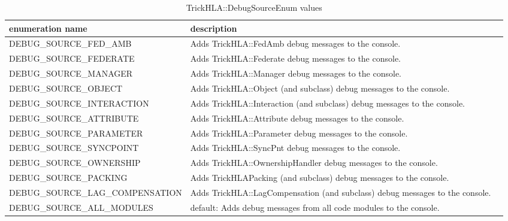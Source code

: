 \begin{table}[ht]
  \scriptsize
  \begin{center}
    \begin{tabular}{|p{2in}|l|p{3.25in}|}
    \hline
    enumeration name & description \\
    \hline \hline
      {\ttfamily DEBUG\_SOURCE\_FED\_AMB}
      & Adds {\ttfamily TrickHLA::FedAmb} debug messages to the console.
      \\
      \hline
      {\ttfamily DEBUG\_SOURCE\_FEDERATE}
      & Adds {\ttfamily TrickHLA::Federate} debug messages to the console.
      \\
      \hline
      {\ttfamily DEBUG\_SOURCE\_MANAGER}
      & Adds {\ttfamily TrickHLA::Manager} debug messages to the console.
      \\
      \hline
      {\ttfamily DEBUG\_SOURCE\_OBJECT}
      & Adds {\ttfamily TrickHLA::Object} (and subclass) debug messages to the
        console.
      \\
      \hline
      {\ttfamily DEBUG\_SOURCE\_INTERACTION}
      & Adds {\ttfamily TrickHLA::Interaction} (and subclass) debug messages to
        the console.
      \\
      \hline
      {\ttfamily DEBUG\_SOURCE\_ATTRIBUTE}
      & Adds {\ttfamily TrickHLA::Attribute} debug messages to the console.
      \\
      \hline
      {\ttfamily DEBUG\_SOURCE\_PARAMETER}
      & Adds {\ttfamily TrickHLA::Parameter} debug messages to the console.
      \\
      \hline
      {\ttfamily DEBUG\_SOURCE\_SYNCPOINT}
      & Adds {\ttfamily TrickHLA::SyncPnt} debug messages to the console.
      \\
      \hline
      {\ttfamily DEBUG\_SOURCE\_OWNERSHIP}
      & Adds {\ttfamily TrickHLA::OwnershipHandler} debug messages to the console.
      \\
      \hline
      {\ttfamily DEBUG\_SOURCE\_PACKING}
      & Adds {\ttfamily TrickHLAPacking} (and subclass) debug messages to the
        console.
      \\
      \hline
      {\ttfamily DEBUG\_SOURCE\_LAG\_COMPENSATION}
      & Adds {\ttfamily TrickHLA::LagCompensation} (and subclass) debug messages
        to the console.
      \\
      \hline
      {\ttfamily DEBUG\_SOURCE\_ALL\_MODULES}
      & {\ttfamily default}: Adds debug messages from all code modules to the console.
      \\
      \hline
    \end{tabular}
  \end{center}
  \caption{TrickHLA::DebugSourceEnum values}
  \label{tab:code_sections}
\end{table}
